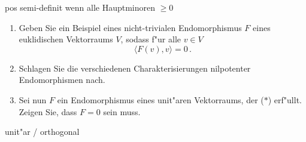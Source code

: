 \documentclass[a4,11pt]{article}
\begin{document}
\vspace*{-17mm}
{
\kopf
}



\begin{aufgabe}[4 Punkte]
pos semi-definit wenn alle Hauptminoren $\ge 0$
\end{aufgabe}

\begin{aufgabe}[4 Punkte]
  \begin{enumerate}
  \item Geben Sie ein Beispiel eines nicht-trivialen Endomorphismus
    $F$ eines euklidischen Vektorraums $V$, sodass f"ur alle $v \in V$
    \begin{equation}
      \tag{$*$}
      \langle F(v), v \rangle = 0 \,.
    \end{equation}
  \item Schlagen Sie die verschiedenen Charakterisierungen nilpotenter
    Endomorphismen nach.
  \item Sei nun $F$ ein Endomorphismus eines unit"aren Vektorraums,
    der ($*$) erf"ullt. Zeigen Sie, dass $F=0$ sein muss.
  \end{enumerate}
\end{aufgabe}

\begin{aufgabe}[4 Punkte]
unit"ar / orthogonal
\end{aufgabe}
\end{document}
